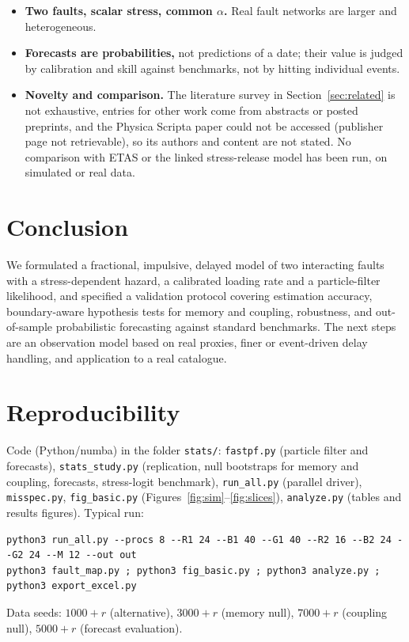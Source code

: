 \documentclass[11pt,a4paper]{article}
\begin{document}
\begin{itemize}
\item \textbf{Two faults, scalar stress, common $\alpha$.} Real fault networks are larger and heterogeneous.
\item \textbf{Forecasts are probabilities,} not predictions of a date; their value is judged by calibration and skill against benchmarks, not by hitting individual events.
\item \textbf{Novelty and comparison.} The literature survey in Section~\ref{sec:related} is not exhaustive, entries for other work come from abstracts or posted preprints, and the Physica Scripta paper \citep{PhysScr2024} could not be accessed (publisher page not retrievable), so its authors and content are not stated. No comparison with ETAS or the linked stress-release model has been run, on simulated or real data.
\end{itemize}

\section{Conclusion}
We formulated a fractional, impulsive, delayed model of two interacting faults with a stress-dependent hazard, a calibrated loading rate and a particle-filter likelihood, and specified a validation protocol covering estimation accuracy, boundary-aware hypothesis tests for memory and coupling, robustness, and out-of-sample probabilistic forecasting against standard benchmarks. The next steps are an observation model based on real proxies, finer or event-driven delay handling, and application to a real catalogue.

\section{Reproducibility}\label{sec:repro}
Code (Python/numba) in the folder \texttt{stats/}: \texttt{fastpf.py} (particle filter and forecasts), \texttt{stats\_study.py} (replication, null bootstraps for memory and coupling, forecasts, stress-logit benchmark), \texttt{run\_all.py} (parallel driver), \texttt{misspec.py}, \texttt{fig\_basic.py} (Figures~\ref{fig:sim}--\ref{fig:slices}), \texttt{analyze.py} (tables and results figures). Typical run:
\begin{verbatim}
python3 run_all.py --procs 8 --R1 24 --B1 40 --G1 40 --R2 16 --B2 24 --G2 24 --M 12 --out out
python3 fault_map.py ; python3 fig_basic.py ; python3 analyze.py ; python3 export_excel.py
\end{verbatim}
Data seeds: $1000+r$ (alternative), $3000+r$ (memory null), $7000+r$ (coupling null), $5000+r$ (forecast evaluation).
\end{document}
